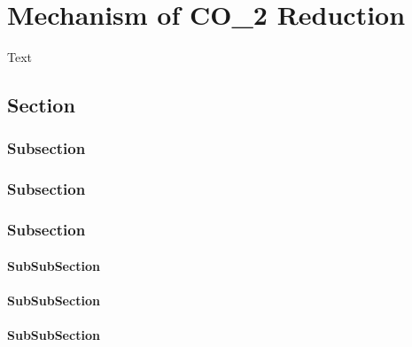 \chapter{Mechanism of CO_{2} Reduction}
Text
\section{Section}
\subsection{Subsection}

\subsection{Subsection}

\subsection{Subsection}

\subsubsection{SubSubSection}

\subsubsection{SubSubSection}

\subsubsection{SubSubSection}


